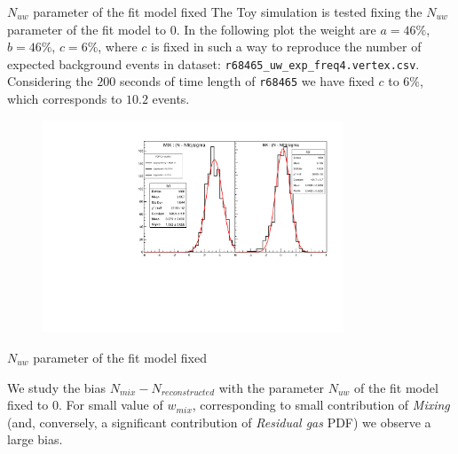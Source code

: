 \documentclass[9pt]{beamer}
\newcommand{\nologo}{\setbeamertemplate{logo}{}}
\begin{document}
{
\begin{frame}{$N_{uw}$ parameter of the fit model fixed}
The Toy simulation is tested fixing the $N_{uw}$ parameter of the fit model to $0$. In the following plot the weight are $a = 46\%$, $b = 46\%$, $c = 6\%$, where $c$ is fixed in such a way to reproduce the number of expected background events in dataset: \texttt{r68465\_uw\_exp\_freq4.vertex.csv}. Considering the $200$ seconds of time length of \texttt{r68465} we have fixed $c$ to $6\%$, which corresponds to $10.2$ events.
\begin{figure}
\includegraphics[width = 0.8\textwidth]{N165/ToyNmixNbk,NuwFixed(46,46,6).pdf}
\end{figure}
\end{frame}
}

{\nologo
\begin{frame}{$N_{uw}$ parameter of the fit model fixed}

We study the bias $N_{mix} - N_{reconstructed}$ with the parameter $N_{uw}$ of the fit model fixed to $0$. For small value of $w_{mix}$, corresponding to small contribution of \textit{Mixing}  (and, conversely, a significant contribution of \textit{Residual gas} PDF) we observe a large bias.

\begin{figure}
\end{figure}
\end{frame}
}
\end{document}
